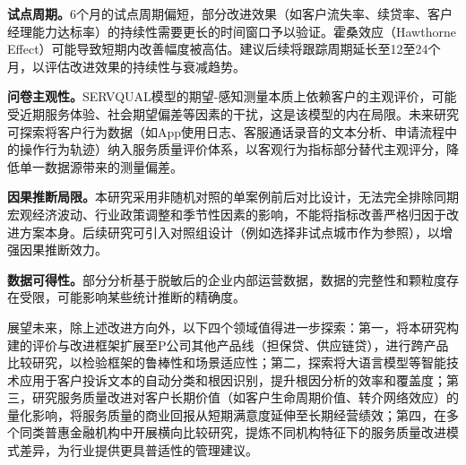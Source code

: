 \textbf{试点周期。}6个月的试点周期偏短，部分改进效果（如客户流失率、续贷率、客户经理能力达标率）的持续性需要更长的时间窗口予以验证。霍桑效应（Hawthorne Effect）可能导致短期内改善幅度被高估。建议后续将跟踪周期延长至12至24个月，以评估改进效果的持续性与衰减趋势。
\par

\textbf{问卷主观性。}SERVQUAL模型的期望-感知测量本质上依赖客户的主观评价，可能受近期服务体验、社会期望偏差等因素的干扰，这是该模型的内在局限\cite{ref14}。未来研究可探索将客户行为数据（如App使用日志、客服通话录音的文本分析、申请流程中的操作行为轨迹）纳入服务质量评价体系，以客观行为指标部分替代主观评分，降低单一数据源带来的测量偏差。
\par

\textbf{因果推断局限。}本研究采用非随机对照的单案例前后对比设计，无法完全排除同期宏观经济波动、行业政策调整和季节性因素的影响，不能将指标改善严格归因于改进方案本身。后续研究可引入对照组设计（例如选择非试点城市作为参照），以增强因果推断效力。
\par

\textbf{数据可得性。}部分分析基于脱敏后的企业内部运营数据，数据的完整性和颗粒度存在受限，可能影响某些统计推断的精确度。
\par

展望未来，除上述改进方向外，以下四个领域值得进一步探索：第一，将本研究构建的评价与改进框架扩展至P公司其他产品线（担保贷、供应链贷），进行跨产品比较研究，以检验框架的鲁棒性和场景适应性；第二，探索将大语言模型等智能技术应用于客户投诉文本的自动分类和根因识别，提升根因分析的效率和覆盖度；第三，研究服务质量改进对客户长期价值（如客户生命周期价值、转介网络效应）的量化影响，将服务质量的商业回报从短期满意度延伸至长期经营绩效；第四，在多个同类普惠金融机构中开展横向比较研究，提炼不同机构特征下的服务质量改进模式差异，为行业提供更具普适性的管理建议。
\par
